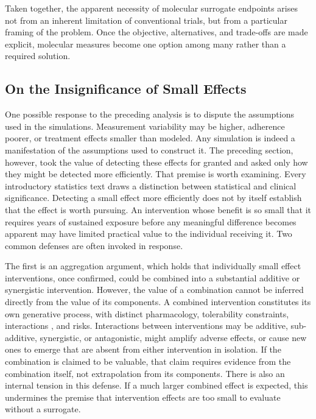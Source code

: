 \documentclass[twocolumn]{article} %
\begin{document}
Taken together, the apparent necessity of molecular surrogate endpoints arises not from an inherent limitation of conventional trials, but from a particular framing of the problem. Once the objective, alternatives, and trade-offs are made explicit, molecular measures become one option among many rather than a required solution.

\subsection{On the Insignificance of Small Effects}

One possible response to the preceding analysis is to dispute the assumptions used in the simulations. Measurement variability may be higher, adherence poorer, or treatment effects smaller than modeled. Any simulation is indeed a manifestation of the assumptions used to construct it. The preceding section, however, took the value of detecting these effects for granted and asked only how they might be detected more efficiently. That premise is worth examining. Every introductory statistics text draws a distinction between statistical and clinical significance. Detecting a small effect more efficiently does not by itself establish that the effect is worth pursuing. An intervention whose benefit is so small that it requires years of sustained exposure before any meaningful difference becomes apparent may have limited practical value to the individual receiving it. Two common defenses are often invoked in response.

The first is an aggregation argument, which holds that individually small effect interventions, once confirmed, could be combined into a substantial additive or synergistic intervention. However, the value of a combination cannot be inferred directly from the value of its components. A combined intervention constitutes its own generative process, with distinct pharmacology, tolerability constraints, interactions \citep{keys2025emerging}, and risks. Interactions between interventions may be additive, sub-additive, synergistic, or antagonistic, might amplify adverse effects, or cause new ones to emerge that are absent from either intervention in isolation. If the combination is claimed to be valuable, that claim requires evidence from the combination itself, not extrapolation from its components. There is also an internal tension in this defense. If a much larger combined effect is expected, this undermines the premise that intervention effects are too small to evaluate without a surrogate.
\end{document}

